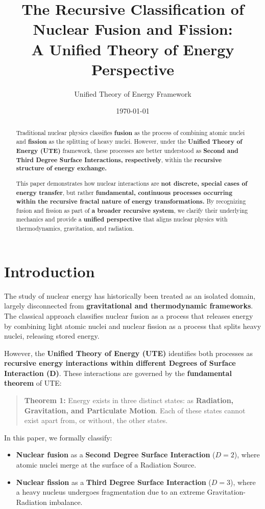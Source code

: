 \documentclass{article}
\title{The Recursive Classification of Nuclear Fusion and Fission: \\ A Unified Theory of Energy Perspective}
\author{Unified Theory of Energy Framework}
\date{\today}
\begin{document}
\maketitle

\begin{abstract}
Traditional nuclear physics classifies \textbf{fusion} as the process of combining atomic nuclei and \textbf{fission} as the splitting of heavy nuclei. However, under the \textbf{Unified Theory of Energy (UTE)} framework, these processes are better understood as \textbf{Second and Third Degree Surface Interactions, respectively}, within the \textbf{recursive structure of energy exchange.} 

This paper demonstrates how nuclear interactions are \textbf{not discrete, special cases of energy transfer}, but rather \textbf{fundamental, continuous processes occurring within the recursive fractal nature of energy transformations.} By recognizing fusion and fission as part of \textbf{a broader recursive system}, we clarify their underlying mechanics and provide a \textbf{unified perspective} that aligns nuclear physics with thermodynamics, gravitation, and radiation.
\end{abstract}

\section{Introduction}
The study of nuclear energy has historically been treated as an isolated domain, largely disconnected from \textbf{gravitational and thermodynamic frameworks}. The classical approach classifies nuclear fusion as a process that releases energy by combining light atomic nuclei and nuclear fission as a process that splits heavy nuclei, releasing stored energy. 

However, the \textbf{Unified Theory of Energy (UTE)} identifies both processes as \textbf{recursive energy interactions within different Degrees of Surface Interaction (D)}. These interactions are governed by the \textbf{fundamental theorem} of UTE:

\begin{quotation}
\textbf{Theorem 1:} Energy exists in three distinct states: as \textbf{Radiation, Gravitation, and Particulate Motion}. Each of these states cannot exist apart from, or without, the other states.
\end{quotation}

In this paper, we formally classify:
\begin{itemize}
    \item \textbf{Nuclear fusion} as a \textbf{Second Degree Surface Interaction} ($D=2$), where atomic nuclei merge at the surface of a Radiation Source.
    \item \textbf{Nuclear fission} as a \textbf{Third Degree Surface Interaction} ($D=3$), where a heavy nucleus undergoes fragmentation due to an extreme Gravitation-Radiation imbalance.
\end{itemize}
\end{document}
